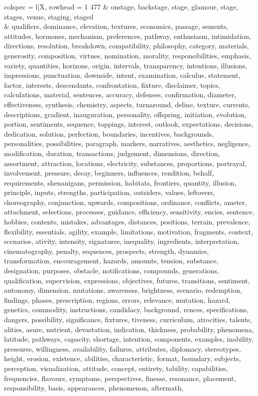 \begin{tblr}[
  long,
  caption = {Examples from SNLI.},
  entry = {Short Caption},
  label = {tblr:test},
]{
colspec = {l|X},
rowhead = 1}
477 & onstage, backstage, stage, glamour, stage, stages, venue, staging, staged \\ & qualifiers, dominance, elevation, textures, economics, passage, sements, attitudes, hormones, mechanism, preferences, pathway, enthusiasm, intimidation, directions, resolution, breakdown, compatibility, philosophy, category, materials, generosity, composition, virtues, nomination, morality, responsibilities, emphasis, variety, quantities, horizons, origin, intervals, transparency, intentions, illusions, impressions, punctuation, downside, intent, examination, calculus, statement, factor, interests, descendants, confrontation, fixture, disclaimer, topics, calculations, material, sentences, accuracy, defenses, confirmation, diameter, effectiveness, synthesis, chemistry, aspects, turnaround, deline, texture, currents, descriptions, gradient, inauguration, personality, offspring, initiation, evolution, portion, sentiments, sequence, toppings, interest, outlook, expectations, decisions, dedication, solution, perfection, boundaries, incentives, backgrounds, personalities, possibilities, paragraph, markers, narratives, aesthetics, negligence, modification, duration, transactions, judgement, dimensions, direction, assortment, attraction, locations, electricity, substances, proportions, portrayal, involvement, pressure, decay, beginners, influences, rendition, behalf, requirements, shenanigans, permission, habitats, frontiers, quantity, illusion, principle, inputs, strengths, participation, outsiders, values, leftovers, choreography, conjunction, upwards, compositions, ordinance, conflicts, ameter, attachment, selections, processes, guidance, efficiency, sensitivity, encies, sentence, hobbies, contents, mistakes, advantages, distances, positions, terrain, prevalence, flexibility, essentials, agility, example, limitations, motivation, fragments, context, scenarios, ativity, intensity, signatures, inequality, ingredients, interpretation, cinematography, penalty, sequences, prospects, strength, dynamics, transformation, encouragement, hazards, amounts, tension, substance, designation, purposes, obstacle, notifications, compounds, generations, qualification, supervision, expressions, objectives, futures, transitions, sentiment, autonomy, dimension, mutations, awareness, brightness, scenario, redemption, findings, phases, prescription, regions, errors, relevance, mutation, hazard, genetics, commodity, instructions, candidacy, background, rences, specifications, dangers, possibility, significance, fixtures, tiveness, curriculum, atrocities, talents, alities, asure, nutrient, devastation, indication, thickness, probability, phenomena, latitude, pathways, capacity, shortage, intention, components, examples, inability, pressures, willingness, availability, failures, attributes, diplomacy, stereotypes, height, erosion, existence, abilities, characteristic, format, boundary, subjects, perception, visualization, attitude, concept, entirety, tability, capabilities, frequencies, flavours, symptoms, perspectives, finesse, resonance, placement, responsibility, basis, appearances, phenomenon, aftermath, 
\end{tblr}
